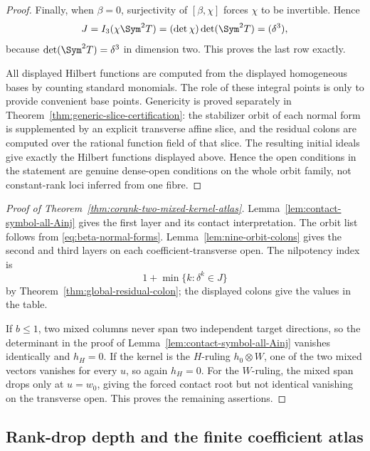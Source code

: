 \begin{proof}
Finally, when \(\beta=0\), surjectivity of
\([\beta,\chi]\) forces \(\chi\) to be invertible.  Hence
\[
 J=I_3(\chi\Sym^2T)
   =(\det\chi)\det(\Sym^2T)
   =(\delta^3),
\]
because \(\det(\Sym^2T)=\delta^3\) in dimension two.  This proves the
last row exactly.

All displayed Hilbert functions are computed from the displayed
homogeneous bases by counting standard monomials.  The role of these
integral points is only to provide convenient base points.
Genericity is proved separately in
Theorem~\ref{thm:generic-slice-certification}: the stabilizer orbit
of each normal form is supplemented by an explicit transverse affine
slice, and the residual colons are computed over the rational
function field of that slice.  The resulting initial ideals give
exactly the Hilbert functions displayed above.  Hence the open
conditions in the statement are genuine dense-open conditions on the
whole orbit family, not constant-rank loci inferred from one fibre.
\end{proof}

\begin{proof}[Proof of Theorem~\ref{thm:corank-two-mixed-kernel-atlas}]
Lemma~\ref{lem:contact-symbol-all-Ainj} gives the first layer and its
contact interpretation.  The orbit list follows from
\eqref{eq:beta-normal-forms}.  Lemma~\ref{lem:nine-orbit-colons}
gives the second and third layers on each coefficient-transverse open.
The nilpotency index is
\[
 1+\min\{k:\delta^k\in J\}
\]
by Theorem~\ref{thm:global-residual-colon}; the displayed colons give
the values in the table.

If \(b\le1\), two mixed columns never span two independent target
directions, so the determinant in the proof of
Lemma~\ref{lem:contact-symbol-all-Ainj} vanishes identically and
\(h_H=0\).  If the kernel is the \(H\)-ruling
\(h_0\otimes W\), one of the two mixed vectors vanishes for every
\(u\), so again \(h_H=0\).  For the \(W\)-ruling, the mixed span
drops only at \(u=w_0\), giving the forced contact root but not
identical vanishing on the transverse open.  This proves the
remaining assertions.
\end{proof}

\subsection{Rank-drop depth and the finite coefficient atlas}


